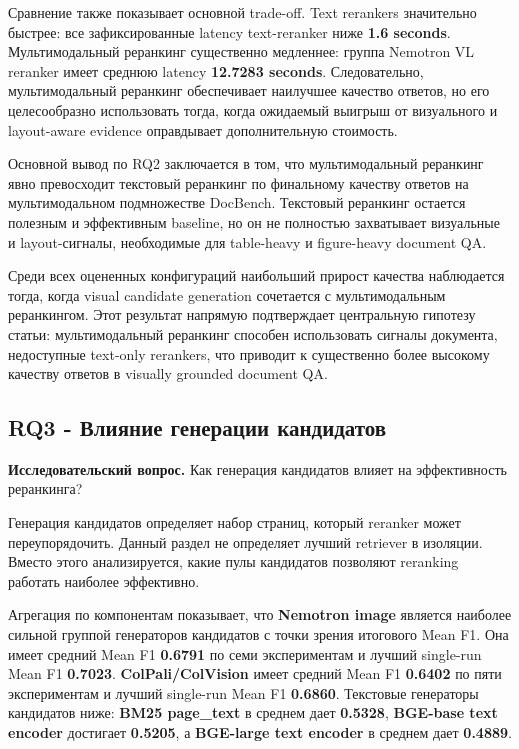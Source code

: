 \documentclass[conference]{IEEEtran}
\begin{document}
Сравнение также показывает основной trade-off. Text rerankers значительно быстрее: все зафиксированные latency text-reranker ниже \textbf{1.6 seconds}. Мультимодальный реранкинг существенно медленнее: группа Nemotron VL reranker имеет среднюю latency \textbf{12.7283 seconds}. Следовательно, мультимодальный реранкинг обеспечивает наилучшее качество ответов, но его целесообразно использовать тогда, когда ожидаемый выигрыш от визуального и layout-aware evidence оправдывает дополнительную стоимость.

Основной вывод по RQ2 заключается в том, что мультимодальный реранкинг явно превосходит текстовый реранкинг по финальному качеству ответов на мультимодальном подмножестве DocBench. Текстовый реранкинг остается полезным и эффективным baseline, но он не полностью захватывает визуальные и layout-сигналы, необходимые для table-heavy и figure-heavy document QA.

Среди всех оцененных конфигураций наибольший прирост качества наблюдается тогда, когда visual candidate generation сочетается с мультимодальным реранкингом. Этот результат напрямую подтверждает центральную гипотезу статьи: мультимодальный реранкинг способен использовать сигналы документа, недоступные text-only rerankers, что приводит к существенно более высокому качеству ответов в visually grounded document QA.

\subsection{RQ3 - Влияние генерации кандидатов}

\textbf{Исследовательский вопрос.} Как генерация кандидатов влияет на эффективность реранкинга?

Генерация кандидатов определяет набор страниц, который reranker может переупорядочить. Данный раздел не определяет лучший retriever в изоляции. Вместо этого анализируется, какие пулы кандидатов позволяют reranking работать наиболее эффективно.

Агрегация по компонентам показывает, что \textbf{Nemotron image} является наиболее сильной группой генераторов кандидатов с точки зрения итогового Mean F1. Она имеет средний Mean F1 \textbf{0.6791} по семи экспериментам и лучший single-run Mean F1 \textbf{0.7023}. \textbf{ColPali/ColVision} имеет средний Mean F1 \textbf{0.6402} по пяти экспериментам и лучший single-run Mean F1 \textbf{0.6860}. Текстовые генераторы кандидатов ниже: \textbf{BM25 page\_text} в среднем дает \textbf{0.5328}, \textbf{BGE-base text encoder} достигает \textbf{0.5205}, а \textbf{BGE-large text encoder} в среднем дает \textbf{0.4889}.
\end{document}
